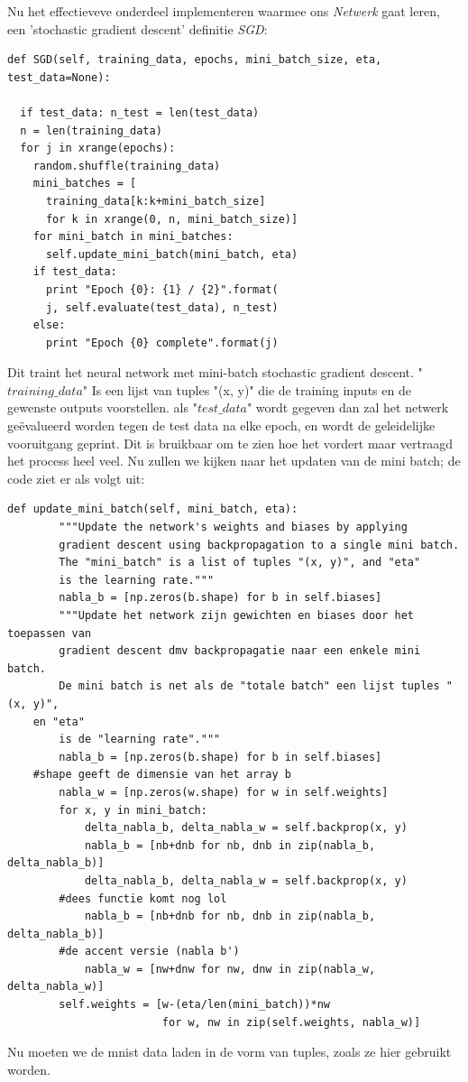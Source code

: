 \documentclass[10pt,a4paper,twoside]{article}
\begin{document}
Nu het effectieveve onderdeel implementeren waarmee ons \textit{Netwerk} gaat leren, een 'stochastic gradient descent' definitie \textit{SGD}:
\begin{verbatim}
def SGD(self, training_data, epochs, mini_batch_size, eta,
test_data=None):

  if test_data: n_test = len(test_data)
  n = len(training_data)
  for j in xrange(epochs):
    random.shuffle(training_data)
    mini_batches = [
      training_data[k:k+mini_batch_size]
      for k in xrange(0, n, mini_batch_size)]
    for mini_batch in mini_batches:
      self.update_mini_batch(mini_batch, eta)
    if test_data:
      print "Epoch {0}: {1} / {2}".format(
      j, self.evaluate(test_data), n_test)
    else:
      print "Epoch {0} complete".format(j)
\end{verbatim}
Dit traint het neural network met mini-batch stochastic
gradient descent. "$training\_data$" Is een lijst van tuples
"(x, y)" die de training inputs en de gewenste
outputs voorstellen. als "$test\_data$" wordt gegeven dan zal het
netwerk geëvalueerd worden tegen de test data na elke
epoch, en wordt de geleidelijke vooruitgang geprint. Dit is bruikbaar om te zien hoe het vordert
maar vertraagd het process heel veel.
Nu zullen we kijken naar het updaten van de mini batch; de code ziet er als volgt uit:
\newpage
\begin{verbatim}
def update_mini_batch(self, mini_batch, eta):
        """Update the network's weights and biases by applying
        gradient descent using backpropagation to a single mini batch.
        The "mini_batch" is a list of tuples "(x, y)", and "eta"
        is the learning rate."""
        nabla_b = [np.zeros(b.shape) for b in self.biases]
        """Update het network zijn gewichten en biases door het toepassen van
        gradient descent dmv backpropagatie naar een enkele mini batch.
        De mini batch is net als de "totale batch" een lijst tuples "(x, y)", 
	en "eta"
        is de "learning rate"."""
        nabla_b = [np.zeros(b.shape) for b in self.biases] 
	#shape geeft de dimensie van het array b
        nabla_w = [np.zeros(w.shape) for w in self.weights]
        for x, y in mini_batch:
            delta_nabla_b, delta_nabla_w = self.backprop(x, y)
            nabla_b = [nb+dnb for nb, dnb in zip(nabla_b, delta_nabla_b)]
            delta_nabla_b, delta_nabla_w = self.backprop(x, y) 
	    #dees functie komt nog lol
            nabla_b = [nb+dnb for nb, dnb in zip(nabla_b, delta_nabla_b)] 
	    #de accent versie (nabla b')
            nabla_w = [nw+dnw for nw, dnw in zip(nabla_w, delta_nabla_w)]
        self.weights = [w-(eta/len(mini_batch))*nw
                        for w, nw in zip(self.weights, nabla_w)]
\end{verbatim}
Nu moeten we de mnist data laden in de vorm van tuples, zoals ze hier gebruikt worden.
\newpage
\end{document}
